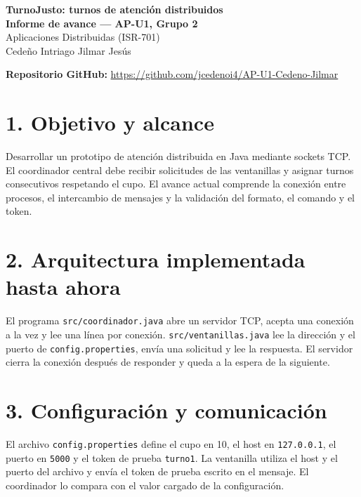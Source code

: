 \documentclass[11pt,a4paper]{article}
\begin{document}
\begin{center}
{\Large\bfseries TurnoJusto: turnos de atención distribuidos}\\[0.15cm]
{\bfseries Informe de avance --- AP-U1, Grupo 2}\\[0.15cm]
Aplicaciones Distribuidas (ISR-701)\\
Cedeño Intriago Jilmar Jesús
\end{center}

\textbf{Repositorio GitHub:} \url{https://github.com/jcedenoi4/AP-U1-Cedeno-Jilmar}

\section*{1. Objetivo y alcance}
Desarrollar un prototipo de atención distribuida en Java mediante sockets TCP. El coordinador central debe recibir solicitudes de las ventanillas y asignar turnos consecutivos respetando el cupo. El avance actual comprende la conexión entre procesos, el intercambio de mensajes y la validación del formato, el comando y el token.

\section*{2. Arquitectura implementada hasta ahora}
El programa \texttt{src/coordinador.java} abre un servidor TCP, acepta una conexión a la vez y lee una línea por conexión. \texttt{src/ventanillas.java} lee la dirección y el puerto de \texttt{config.properties}, envía una solicitud y lee la respuesta. El servidor cierra la conexión después de responder y queda a la espera de la siguiente.

\begin{center}
\end{center}

\section*{3. Configuración y comunicación}
El archivo \texttt{config.properties} define el cupo en 10, el host en \texttt{127.0.0.1}, el puerto en \texttt{5000} y el token de prueba \texttt{turno1}. La ventanilla utiliza el host y el puerto del archivo y envía el token de prueba escrito en el mensaje. El coordinador lo compara con el valor cargado de la configuración.
\end{document}
